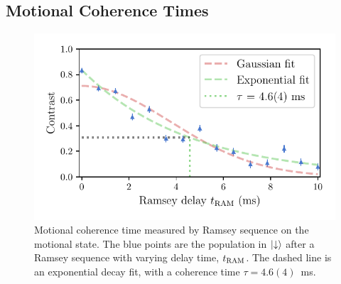 \subsection{Motional Coherence Times}
\label{sec:Motional Coherence}
\begin{figure}
    \begin{center}
    \noindent\includegraphics[width=0.75\linewidth]{
        figures/pdf_figure/motional_coherence.pdf
        }
    \end{center}
    \caption{
        Motional coherence time measured by Ramsey sequence on the motional state. The blue points are the population in $\ket{\downarrow}$ after a Ramsey sequence with varying delay time, $t_{\rm RAM}$. The dashed line is an exponential decay fit, with a coherence time $\tau = 4.6(4)$~\unit{\ms}.
        }
    \label{fig:motional_coherence}
\end{figure}

